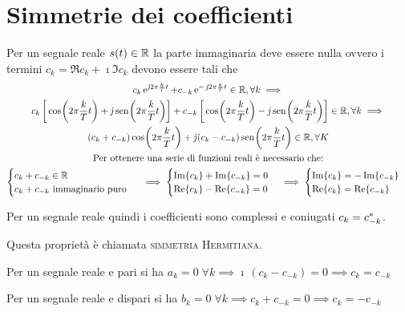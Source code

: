\section{Simmetrie dei coefficienti}
Per un segnale reale $s(t)\in\mathbb{R}$ la parte immaginaria deve essere nulla ovvero i termini $c_k=\Re{c_k}+\imath \Im{c_k}$ devono essere tali che 
\begin{gather*}
	c_k\e{\imath 2\pi\frac{k}{T}t}+c_{-k}\e{-\imath 2\pi\frac{k}{T}t}\in\R, \forall k \implies \\
	c_k \left[\cos{2\pi\frac{k}{T}t}+\imath \sen{2\pi\frac{k}{T}t}\right]
	+c_{-k}\left[\cos{2\pi\frac{k}{T}t}-\imath \sen{2\pi\frac{k}{T}t}\right] \in\R, \forall k \implies \\
	(c_k+c_{-k}) \cos{2\pi\frac{k}{T}t}+\imath\,(c_k-c_{-k})\sen{2\pi\frac{k}{T}t} \in\R, \forall K \\
	\text{Per ottenere una serie di funzioni reali è necessario che:} \\
	\begin{cases}
	c_k+c_{-k}\in\R \\
	c_k+c_{-k}\text{ immaginario puro }
	\end{cases}\implies\begin{cases}
	\Im{c_k}+\Im{c_{-k}}=0 \\
	\Re{c_k}-\Re{c_{-k}}=0
	\end{cases}\implies\begin{cases}
	\Im{c_k}=-\Im{c_{-k}} \\
	\Re{c_k}=\Re{c_{-k}}
	\end{cases}
\end{gather*}

Per un segnale reale quindi i coefficienti sono complessi e coniugati $c_k={c}^\ast_{-k}$.

Questa proprietà è chiamata \textsc{simmetria Hermitiana}.

Per un segnale reale e pari si ha $a_k=0\;\forall k \implies \imath\,(c_k-c_{-k})=0 \implies c_k=c_{-k}$

Per un segnale reale e dispari si ha $b_k=0\;\forall k \implies c_k+c_{-k}=0 \implies c_k=-c_{-k}$

